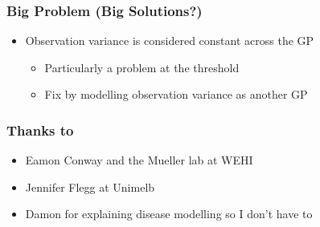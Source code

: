 \documentclass{beamer}
\begin{document}
\begin{frame}

\end{frame}

\begin{frame}
    \frametitle{Big Problem (Big Solutions?)}
    \begin{itemize}
        \item Observation variance is considered constant across the GP\begin{itemize}
                  \item Particularly a problem at the threshold
                  \item <2-> Fix by modelling observation variance as another GP
              \end{itemize}
    \end{itemize}
\end{frame}

\begin{frame}
    \frametitle{Thanks to}
    \begin{itemize}
        \item Eamon Conway and the Mueller lab at WEHI
        \item Jennifer Flegg at Unimelb
        \item Damon for explaining disease modelling so I don't have to
    \end{itemize}
\end{frame}
\end{document}
